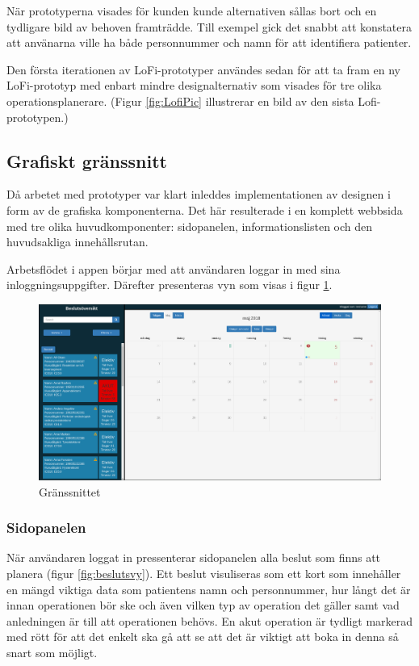 När prototyperna visades för kunden kunde alternativen sållas bort och en tydligare bild av behoven framträdde.
Till exempel gick det snabbt att konstatera att använarna ville ha både personnummer och namn för att identifiera patienter.

Den första iterationen av LoFi-prototyper användes sedan för att ta fram en ny
LoFi-prototyp med enbart mindre designalternativ som visades för tre olika
operationsplanerare. (Figur \ref{fig:LofiPic} illustrerar en bild av den sista Lofi-prototypen.)

\subsection{Grafiskt gränssnitt}
Då arbetet med prototyper var klart inleddes implementationen av designen i form av de grafiska komponenterna. Det här resulterade i en komplett webbsida med tre olika huvudkomponenter: sidopanelen, informationslisten och den huvudsakliga innehållsrutan.

Arbetsflödet i appen börjar med att användaren loggar in med sina inloggningsuppgifter. Därefter presenteras vyn som visas i figur \ref{fig:window}.

\begin{figure}
	\includegraphics[width=\linewidth]{Figures/window.png}
	\caption{Gränssnittet}
	\label{fig:window}
\end{figure}


\subsubsection{Sidopanelen}
När användaren loggat in pressenterar sidopanelen alla beslut som finns att planera (figur \ref{fig:beslutsvy}). Ett beslut visuliseras som ett kort som innehåller en mängd viktiga data som patientens namn och personnummer, hur långt det är innan operationen bör ske och även vilken typ av operation det gäller samt vad anledningen är till att operationen behövs. En akut operation är tydligt markerad med rött för att det enkelt ska gå att se att det är viktigt att boka in denna så snart som möjligt.

